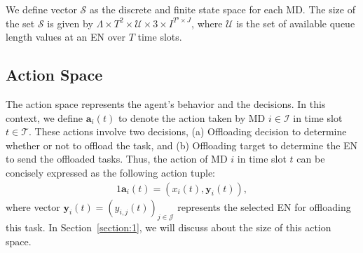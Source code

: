 \documentclass[12pt,draftclsnofoot,onecolumn]{IEEEtran}
\begin{document}
We define vector $\mathcal{S}$ as the discrete and finite state space for each MD. The size of the set $\mathcal{S}$ is given by $\Lambda \times T^2 \times \mathcal{U} \times 3 \times I^{T^{\text{s}} \times J}$, where $\mathcal{U}$ is the set of available queue length values at an EN over $T$ time slots. 








\subsection{Action Space}
The action space represents the agent's behavior and the decisions. In this context, we define $\boldsymbol{a}_i(t)$ to denote the action taken by MD $i \in \mathcal{I}$ in time slot $t \in \mathcal{T}$. These actions involve two decisions, (a) Offloading decision to determine whether or not to offload the task, and (b) Offloading target to determine the EN to send the offloaded tasks. Thus, the action of MD $i$ in time slot $t$ can be concisely expressed as the following action tuple: \vspace{-1.5mm}
\begin{alignat}{1}
	\boldsymbol{a}_i(t) = (x_i(t), \boldsymbol{y}_i(t)),
	\label{20}
\end{alignat}
where vector $\boldsymbol{y}_i(t)=(y_{i,j}(t))_{j \in \mathcal{J}}$ represents the selected EN for offloading this task. In Section~\ref{section:1}, we will discuss about the size of this action space.

\end{document}
